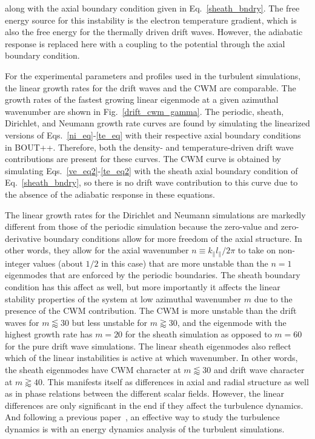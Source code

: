 \documentclass[showpacs,preprintnumbers,amsmath,amssymb,superscriptaddress,aip]{revtex4-1}
\def\para{\parallel}
\begin{document}
along with the axial boundary condition given in Eq.~\ref{sheath_bndry}. The free energy source for this instability is the electron temperature gradient, which is also the free energy
for the thermally driven drift waves. However, the adiabatic response is replaced here with a coupling to the potential through the axial boundary condition.

For the experimental parameters and profiles used in the turbulent simulations, 
the linear growth rates for the drift waves and the CWM are comparable. The growth rates of the fastest growing linear eigenmode at a given azimuthal wavenumber
are shown in Fig.~\ref{drift_cwm_gamma}.
The periodic, sheath, Dirichlet, and Neumann growth rate curves are found by simulating the linearized versions of Eqs.~\ref{ni_eq}-\ref{te_eq} with their respective
axial boundary conditions in BOUT++. Therefore, both the density- and temperature-driven drift wave contributions are present for these curves.
The CWM curve is obtained by simulating Eqs.~\ref{ve_eq2}-\ref{te_eq2} with the sheath axial boundary condition of Eq.~\ref{sheath_bndry}, so there is no drift wave contribution to this curve
due to the absence of the adiabatic response in these equations. 

The linear growth rates for the Dirichlet and Neumann simulations are markedly different from those of the periodic simulation because the zero-value and zero-derivative boundary conditions
allow for more freedom of the axial structure. In other words, they allow for the axial wavenumber $n \equiv k_\para l_\para / 2 \pi$ to take on non-integer values (about $1/2$ in this case) that
are more unstable than the $n=1$ eigenmodes that are enforced by the periodic boundaries. The sheath boundary condition has this affect as well, but more importantly
it affects the linear stability properties of the system at low azimuthal wavenumber $m$ due to the presence of the CWM contribution. The CWM is more unstable
than the drift waves for $m \lessapprox 30$ but less unstable for $m \gtrapprox 30$, and the eigenmode with the highest growth rate has $m=20$ for the sheath simulation as opposed to $m=60$ for the pure
drift wave simulations.
The linear sheath eigenmodes also reflect which of the linear instabilities is active at which wavenumber. In other words, the sheath eigenmodes have CWM character at $m \lessapprox 30$ and drift wave
character at $m \gtrapprox 40$. This manifests itself as differences in axial and radial structure as well as in phase relations between the different scalar fields. However, the linear differences
are only significant in the end if they affect the turbulence dynamics. And following a previous paper~\cite{friedman2012b}, an effective way to study the turbulence dynamics is with
an energy dynamics analysis of the turbulent simulations.
\end{document}
